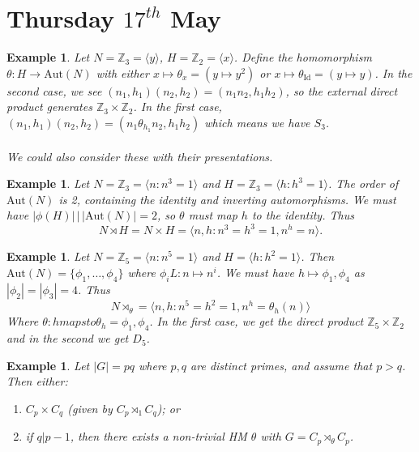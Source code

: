 \documentclass[a4paper,10pt]{article}
\newcommand{\ZZ}{\mathbb{Z}}
\newtheorem{eg}[thm]{Example}
\begin{document}
\newpage
\section{Thursday $17^{th}$ May}

\begin{eg}
Let $N = \ZZ_3 = \langle y \rangle $, $H = \ZZ_2 = \langle x \rangle$. Define the homomorphism $\theta : H \rightarrow \text{Aut}(N)$ with either $x \mapsto \theta_x = (y \mapsto y^2)$ or $x \mapsto \theta_{\text{Id}} = (y \mapsto y)$. In the second case, we see $(n_1, h_1)(n_2, h_2) = (n_1 n_2, h_1h_2)$, so the external direct product generates $\ZZ_3 \times \ZZ_2$. In the first case, $(n_1, h_1)(n_2, h_2) = (n_1 \theta_{h_1} n_2, h_1 h_2)$ which means we have $S_3$. \\
\\
We could also consider these with their presentations.
\end{eg}

\begin{eg}
Let $N = \ZZ_3 = \langle n : n^3 = 1 \rangle$ and $H = \ZZ_3 = \langle h : h^3 = 1 \rangle$.
The order of $\text{Aut}(N)$ is 2, containing the identity and inverting automorphisms. We must have $| \phi(H) | \, \big| \, |\text{Aut}(N) | = 2$, so $\theta$ must map $h$ to the identity. Thus
\[ N \rtimes H = N \times H = \langle n,h : n^3 = h^3 = 1, n^h = n \rangle. \]
\end{eg}

\begin{eg}
Let $N = \ZZ_5 = \langle n : n^5 = 1 \rangle$ and $H = \langle h : h^2 = 1 \rangle$. Then $\text{Aut}(N) = \{ \phi_1, \dots, \phi_4 \}$ where $\phi_i L: n \mapsto n^i$. We must have $h \mapsto \phi_1, \phi_4$ as $|\phi_2| = |\phi_3| = 4$. Thus
\[ N \rtimes_\theta = \langle n,h : n^5 = h^2 = 1, n^h = \theta_h(n) \rangle \]
Where $\theta : h mapsto \theta_h = \phi_1, \phi_4$. In the first case, we get the direct product $\ZZ_5 \times \ZZ_2$ and in the second we get $D_5$. 
\end{eg}

\begin{eg}
Let $|G| = pq$ where $p,q$ are distinct primes, and assume that $p > q$. Then either:
\begin{enumerate}
\item $C_p \times C_q$ (given by $C_p \rtimes_1 C_q$); or
\item if $q | p -1$, then there exists a non-trivial HM $\theta$ with $G = C_p \rtimes_\theta C_p$.
\end{enumerate}

\end{eg}
\end{document}
